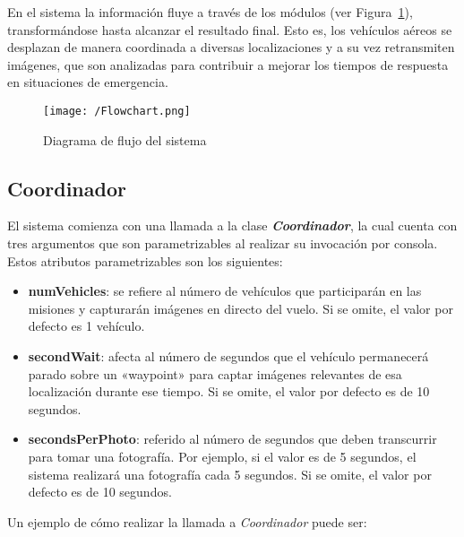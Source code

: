 En el sistema la información fluye a través de los módulos (ver Figura~\ref{fig:diagflujo}), transformándose hasta alcanzar el resultado final. Esto es, los vehículos aéreos se desplazan de manera coordinada a diversas localizaciones y a su vez retransmiten imágenes, que son analizadas para contribuir a mejorar los tiempos de respuesta en situaciones de emergencia.

\begin{figure}[!h]
\begin{center}
\texttt{[image: /Flowchart.png]}
\caption[Diagrama de flujo del sistema]{Diagrama de flujo del sistema}
\label{fig:diagflujo}
\end{center}
\end{figure}

\subsection{Coordinador}
\label{sec:coordinador}

El sistema comienza con una llamada a la clase \textbf{\textit{Coordinador}}, la cual cuenta con tres argumentos que son parametrizables al realizar su invocación por consola. Estos atributos parametrizables son los siguientes:
\begin{itemize}
\item \textbf{numVehicles}: se refiere al número de vehículos que participarán en las misiones y capturarán imágenes en directo del vuelo. Si se omite, el valor por defecto es 1 vehículo.
\item \textbf{secondWait}: afecta al número de segundos que el vehículo permanecerá parado sobre un «waypoint» para captar imágenes relevantes de esa localización durante ese tiempo. Si se omite, el valor por defecto es de 10 segundos.
\item \textbf{secondsPerPhoto}: referido al número de segundos que deben transcurrir para tomar una fotografía. Por ejemplo, si el valor es de 5 segundos, el sistema realizará una fotografía cada 5 segundos. Si se omite, el valor por defecto es de 10 segundos.
\end{itemize} 

Un ejemplo de cómo realizar la llamada a \textit{Coordinador} puede ser:



